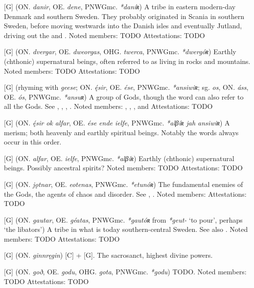 \begin{itemize}

[G] (ON. \emph{danir}, OE. \emph{dene}, PNWGmc. \emph{*daníʀ})
  A tribe in eastern modern-day Denmark and southern Sweden. They probably originated in Scania in southern Sweden, before moving westwards into the Danish isles and eventually Jutland, driving out the  and .
  Noted members: TODO
  Attestations: TODO

[G] (ON. \emph{dvergar}, OE. \emph{dweorgas}, OHG. \emph{twerca}, PNWGmc. \emph{*dwergóʀ})
  Earthly (chthonic) supernatural beings, often referred to as living in rocks and mountains.
  Noted members: TODO
  Attestations: TODO

[G] (rhyming with \emph{geese}; ON. \emph{ę́sir}, OE. \emph{ése}, PNWGmc. \emph{*ansiwiʀ}; sg. \emph{os}, ON. \emph{áss}, OE. \emph{ós}, PNWGmc. \emph{*ansuʀ})
  A group of Gods, though the word can also refer to all the Gods. See , , , .
  Noted members: , , ,  and 
  Attestations: TODO

[G] (ON. \emph{ę́sir ok alfar}, OE. \emph{ése ende ielfe}, PNWGmc. \emph{*alβíʀ jah ansiwiʀ})
  A merism; both heavenly and earthly spiritual beings. Notably the words always occur in this order.

[G] (ON. \emph{alfar}, OE. \emph{ielfe}, PNWGmc. \emph{*alβíʀ})
  Earthly (chthonic) supernatural beings. Possibly ancestral spirits?
  Noted members: TODO
  Attestations: TODO

[G] (ON. \emph{jǫtnar}, OE. \emph{eotenas}, PNWGmc. \emph{*etunóʀ})
  The fundamental enemies of the Gods, the agents of chaos and disorder. See , .
  Noted members: 
  Attestations: TODO

[G] (ON. \emph{gautar}, OE. \emph{géatas}, PNWGmc. \emph{*gautóʀ} from \emph{*geut-} ‘to pour’, perhaps ‘the libators’)
  A tribe in what is today southern-central Sweden. See also .
  Noted members: TODO
  Attestations: TODO

[G] (ON. \emph{ginnręgin})
  [C] + [G]. The sacrosanct, highest divine powers.

[G] (ON. \emph{goð}, OE. \emph{godu}, OHG. \emph{gota}, PNWGmc. \emph{*godu})
  TODO.
  Noted members: TODO
  Attestations: TODO


\end{itemize}
